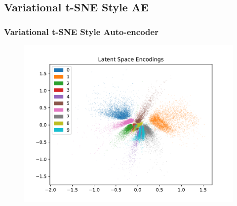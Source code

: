\documentclass[10pt, usenames, dvipsnames, table]{beamer}
\begin{document}
\subsection{Variational t-SNE Style AE}


\begin{frame}
  \frametitle{Variational t-SNE Style Auto-encoder}
  \begin{figure}
    \centering
    \includegraphics[width=\linewidth]
    {models/mnist_vaestudent_e300_L2_b64/encodings}
    \caption{}
    \label{}
  \end{figure}
\end{frame}
\end{document}
